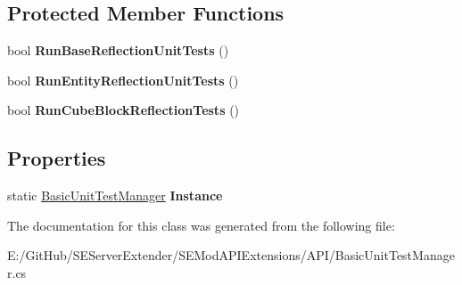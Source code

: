 \subsection*{Protected Member Functions}
\begin{DoxyCompactItemize}
\item 
\hypertarget{class_s_e_mod_a_p_i_extensions_1_1_a_p_i_1_1_basic_unit_test_manager_a644b17b37e30a378f6e3f03b0f16f7ad}{}bool {\bfseries Run\+Base\+Reflection\+Unit\+Tests} ()\label{class_s_e_mod_a_p_i_extensions_1_1_a_p_i_1_1_basic_unit_test_manager_a644b17b37e30a378f6e3f03b0f16f7ad}

\item 
\hypertarget{class_s_e_mod_a_p_i_extensions_1_1_a_p_i_1_1_basic_unit_test_manager_acc2c9207565e315d1151e68b6b5bdeb8}{}bool {\bfseries Run\+Entity\+Reflection\+Unit\+Tests} ()\label{class_s_e_mod_a_p_i_extensions_1_1_a_p_i_1_1_basic_unit_test_manager_acc2c9207565e315d1151e68b6b5bdeb8}

\item 
\hypertarget{class_s_e_mod_a_p_i_extensions_1_1_a_p_i_1_1_basic_unit_test_manager_a3928543ba257d4d065b0804cafede33c}{}bool {\bfseries Run\+Cube\+Block\+Reflection\+Tests} ()\label{class_s_e_mod_a_p_i_extensions_1_1_a_p_i_1_1_basic_unit_test_manager_a3928543ba257d4d065b0804cafede33c}

\end{DoxyCompactItemize}
\subsection*{Properties}
\begin{DoxyCompactItemize}
\item 
\hypertarget{class_s_e_mod_a_p_i_extensions_1_1_a_p_i_1_1_basic_unit_test_manager_a084db79b76412cbea8d63c209287a610}{}static \hyperlink{class_s_e_mod_a_p_i_extensions_1_1_a_p_i_1_1_basic_unit_test_manager}{Basic\+Unit\+Test\+Manager} {\bfseries Instance}\label{class_s_e_mod_a_p_i_extensions_1_1_a_p_i_1_1_basic_unit_test_manager_a084db79b76412cbea8d63c209287a610}

\end{DoxyCompactItemize}


The documentation for this class was generated from the following file\+:\begin{DoxyCompactItemize}
\item 
E\+:/\+Git\+Hub/\+S\+E\+Server\+Extender/\+S\+E\+Mod\+A\+P\+I\+Extensions/\+A\+P\+I/Basic\+Unit\+Test\+Manager.\+cs\end{DoxyCompactItemize}
